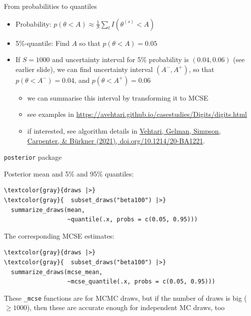 \documentclass[english,t]{beamer}
\begin{document}
\begin{frame}{From probabilities to quantiles}

  \begin{itemize}
  \item Probability: $p(\theta < A)\approx \frac{1}{S}\sum_l I(\theta^{(s)} < A)$
  \item 5\%-quantile: Find $A$ so that $p(\theta < A)=0.05$
  \item<2-> If $S=1000$ and uncertainty interval for 5\% probability
    is $(0.04,0.06)$ (see earlier slide), we can find uncertainty
    interval $(A^-,A^+)$, so that $p(\theta < A^-)=0.04$, and
    $p(\theta < A^+)=0.06$
    \begin{itemize}
    \item<3-> we can summarise this interval by transforming it to MCSE
    \item<3-> see examples in \url{https://avehtari.github.io/casestudies/Digits/digits.html}
    \item<3-> {\color{gray}if interested, see algorithm details in \href{https://doi.org/10.1214/20-BA1221}{Vehtari, Gelman, Simpson, Carpenter, \& Bürkner (2021), doi.org/10.1214/20-BA1221}.}
    \end{itemize}
  \end{itemize}
  
\end{frame}

\begin{frame}[fragile]{\texttt{posterior} package}

  Posterior mean and 5\% and 95\% quantiles:
\vspace{-.5\baselineskip}
  {\small
\begin{Verbatim}[commandchars=\\\{\}]
\textcolor{gray}{draws |>}
\textcolor{gray}{  subset_draws("beta100") |>}
  summarize_draws(mean,
                  ~quantile(.x, probs = c(0.05, 0.95)))
\end{Verbatim}
    }

\pause
The corresponding MCSE estimates:
\vspace{-.5\baselineskip}
  {\small
\begin{Verbatim}[commandchars=\\\{\}]
\textcolor{gray}{draws |>}
\textcolor{gray}{  subset_draws("beta100") |>}
  summarize_draws(mcse_mean,
                  ~mcse_quantile(.x, probs = c(0.05, 0.95)))
\end{Verbatim}
  }

  \pause
  These \texttt{\_mcse} functions are for MCMC draws, but if
  the number of draws is big ($\geq 1000$), then these are accurate
  enough for independent MC draws, too
  
\end{frame}
\end{document}
